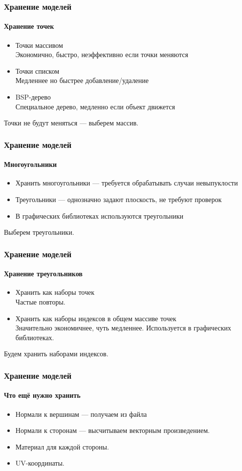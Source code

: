 \documentclass{beamer}
\begin{document}
\begin{frame}
\frametitle{Хранение моделей}
\framesubtitle{Хранение точек}

\begin{itemize}
\item Точки массивом \\
Экономично, быстро, неэффективно если точки меняются
\item Точки списком \\
Медленнее но быстрее добавление/удаление
\item BSP-дерево \\
Специальное дерево, медленно если объект движется
\end{itemize}
Точки не будут меняться --- выберем массив.
\end{frame}

\begin{frame}
\frametitle{Хранение моделей}
\framesubtitle{Многоугольники}

\begin{itemize}
\item Хранить многоугольники --- требуется обрабатывать случаи невыпуклости
\item Треугольники --- однозначно задают плоскость, не требуют проверок
\item В графических библиотеках используются треугольники
\end{itemize}
Выберем треугольники.
\end{frame}

\begin{frame}
\frametitle{Хранение моделей}
\framesubtitle{Хранение треугольников}

\begin{itemize}
\item Хранить как наборы точек \\
Частые повторы.
\item Хранить как наборы индексов в общем массиве точек \\
Значительно экономичнее, чуть медленнее. Используется в графических библиотеках.
\end{itemize}
Будем хранить наборами индексов.
\end{frame}

\begin{frame}
\frametitle{Хранение моделей}
\framesubtitle{Что ещё нужно хранить}

\begin{itemize}
\item Нормали к вершинам --- получаем из файла
\item Нормали к сторонам --- высчитываем векторным произведением.
\item Материал для каждой стороны.
\item UV-координаты.
\end{itemize}
\end{frame}
\end{document}
